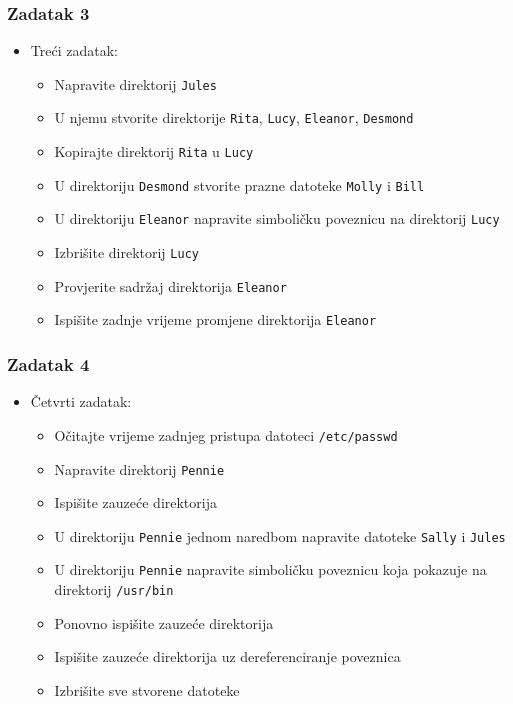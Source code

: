 \documentclass{beamer}
\newcommand{\shell}[1]{\texttt{#1}}
\begin{document}
\begin{frame}[t]
\frametitle{Zadatak 3}
\begin{itemize}
	\item Treći zadatak:
	\begin{itemize}
		\item Napravite direktorij \shell{Jules}
		\item U njemu stvorite direktorije \shell{Rita}, \shell{Lucy}, \shell{Eleanor}, \shell{Desmond}
		\item Kopirajte direktorij \shell{Rita} u \shell{Lucy}
		\item U direktoriju \shell{Desmond} stvorite prazne datoteke \shell{Molly} i \shell{Bill}
		\item U direktoriju \shell{Eleanor} napravite simboličku poveznicu na direktorij \shell{Lucy} 
		\item Izbrišite direktorij \shell{Lucy}
		\item Provjerite sadržaj direktorija \shell{Eleanor}
		\item Ispišite zadnje vrijeme promjene direktorija \shell{Eleanor}
	\end{itemize}
\end{itemize}
\end{frame}

\begin{frame}[t]
\frametitle{Zadatak 4}
\begin{itemize}
	\item Četvrti zadatak:
	\begin{itemize}
		\item Očitajte vrijeme zadnjeg pristupa datoteci \shell{/etc/passwd}
		\item Napravite direktorij \shell{Pennie}
		\item Ispišite zauzeće direktorija
		\item U direktoriju \shell{Pennie} jednom naredbom napravite datoteke \shell{Sally} i \shell{Jules}
		\item U direktoriju \shell{Pennie} napravite simboličku poveznicu koja pokazuje na direktorij \shell{/usr/bin}
		\item Ponovno ispišite zauzeće direktorija
		\item Ispišite zauzeće direktorija uz dereferenciranje poveznica
		\item Izbrišite sve stvorene datoteke
	\end{itemize}
\end{itemize}
\end{frame}
\end{document}
